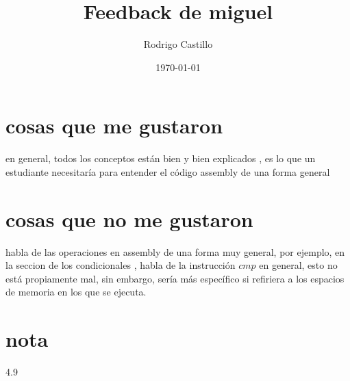 \documentclass[10pt,a4paper]{article} %
\begin{document}
    \title{{  Feedback de miguel  }}
    \author{{Rodrigo Castillo}}
    \date{\today}

    \maketitle


    \section{cosas que me gustaron}
        en general, todos los conceptos están bien y bien explicados , es lo
        que un estudiante necesitaría para entender el código assembly de una
        forma general
    \section{cosas que no me gustaron}
        habla de las operaciones en assembly de una forma muy general, por ejemplo,
        en la seccion de los condicionales , habla de la instrucción $ cmp  $ en
        general, esto no está propiamente mal, sin embargo, sería más específico si
        refiriera a los espacios de memoria en los que se ejecuta.
    \section{nota}
        \color{red} 4.9 \color{black}




















    \nocite{*}
    
    
\end{document}
